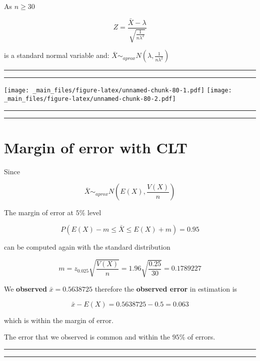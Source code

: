 \documentclass[
]{book}
\begin{document}
As \(n \geq 30\)

\[Z=\frac{\bar{X}-\lambda}{\sqrt{\frac{1}{n\lambda^2}}}\]

is a standard normal variable and: \(\bar{X} \sim_{aprox} N(\lambda, \frac{1}{n\lambda^2})\)

\begin{center}\rule{0.5\linewidth}{0.5pt}\end{center}

\begin{center}\rule{0.5\linewidth}{0.5pt}\end{center}

\texttt{[image: \_main\_files/figure-latex/unnamed-chunk-80-1.pdf]} \texttt{[image: \_main\_files/figure-latex/unnamed-chunk-80-2.pdf]}

\begin{center}\rule{0.5\linewidth}{0.5pt}\end{center}

\begin{center}\rule{0.5\linewidth}{0.5pt}\end{center}

\hypertarget{margin-of-error-with-clt}{%
\section{Margin of error with CLT}\label{margin-of-error-with-clt}}

Since

\[\bar{X} \sim_{aprox}  N(E(X), \frac{V(X)}{n})\]

The margin of error at \(5\%\) level

\[P(E(X)-m \leq \bar{X} \leq E(X) + m)=0.95\]

can be computed again with the standard distribution

\[m=z_{0.025} \sqrt{\frac{V(X)}{n}}=1.96\sqrt{\frac{0.25}{30}}=0.1789227\]

We \textbf{observed} \(\bar{x}=0.5638725\) therefore the \textbf{observed error} in estimation is

\[\bar{x} - E(X)=0.5638725-0.5=0.063\]

which is within the margin of error.

The error that we observed is common and within the \(95\%\) of errors.

\begin{center}\rule{0.5\linewidth}{0.5pt}\end{center}

\begin{center}\rule{0.5\linewidth}{0.5pt}\end{center}
\end{document}
